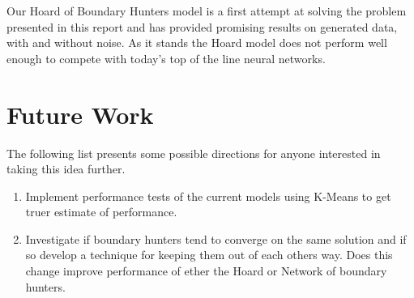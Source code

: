 \documentclass[notitlepage]{report}
\theoremstyle{definition}
\begin{document}
Our Hoard of Boundary Hunters model is a first attempt at solving the problem presented in this report and has provided promising results on generated data, with and without noise. As it stands the Hoard model does not perform well enough to compete with today's top of the line neural networks. 

\section{Future Work}
The following list presents some possible directions for anyone interested in taking this idea further.

\begin{enumerate}
\item Implement performance tests of the current models using K-Means to get truer estimate of performance.
\item Investigate if boundary hunters tend to converge on the same solution and if so develop a technique for keeping them out of each others way. Does this change improve performance of ether the Hoard or Network of boundary hunters.
\end{enumerate}

\newpage


\end{document}
